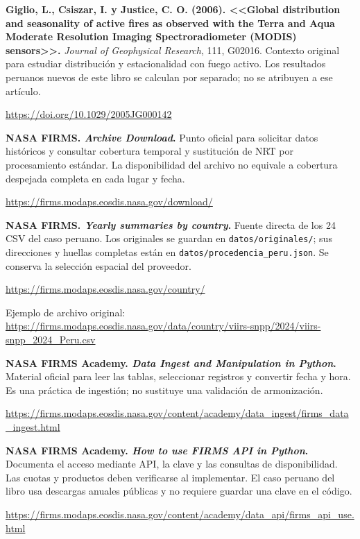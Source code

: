 \begin{enumerate}[label={[\arabic*]},ref=\arabic*,leftmargin=2.2em,itemsep=1em]
\item\label{src:giglio-season} \textbf{Giglio, L., Csiszar, I. y Justice, C. O. (2006).
<<Global distribution and seasonality of active fires as observed with the Terra and Aqua
Moderate Resolution Imaging Spectroradiometer (MODIS) sensors>>.}
\emph{Journal of Geophysical Research}, 111, G02016. Contexto original para estudiar
distribución y estacionalidad con fuego activo. Los resultados peruanos nuevos de este
libro se calculan por separado; no se atribuyen a ese artículo.
\par\url{https://doi.org/10.1029/2005JG000142}

\item\label{src:firms-archive} \textbf{NASA FIRMS. \emph{Archive Download}.}
Punto oficial para solicitar datos históricos y consultar cobertura temporal y sustitución
de NRT por procesamiento estándar. La disponibilidad del archivo no equivale a cobertura
despejada completa en cada lugar y fecha.
\par\url{https://firms.modaps.eosdis.nasa.gov/download/}

\item\label{src:firms-country} \textbf{NASA FIRMS. \emph{Yearly summaries by country}.}
Fuente directa de los 24 CSV del caso peruano. Los originales se guardan en
\texttt{datos/originales/}; sus direcciones y huellas completas están en
\texttt{datos/procedencia\_peru.json}. Se conserva la selección espacial del proveedor.
\par\url{https://firms.modaps.eosdis.nasa.gov/country/}
\par Ejemplo de archivo original:
\url{https://firms.modaps.eosdis.nasa.gov/data/country/viirs-snpp/2024/viirs-snpp_2024_Peru.csv}

\item\label{src:firms-ingest} \textbf{NASA FIRMS Academy. \emph{Data Ingest and Manipulation
in Python}.} Material oficial para leer las tablas, seleccionar registros y convertir
fecha y hora. Es una práctica de ingestión; no sustituye una validación de armonización.
\par\url{https://firms.modaps.eosdis.nasa.gov/content/academy/data_ingest/firms_data_ingest.html}

\item\label{src:firms-api} \textbf{NASA FIRMS Academy. \emph{How to use FIRMS API in Python}.}
Documenta el acceso mediante API, la clave y las consultas de disponibilidad. Las cuotas
y productos deben verificarse al implementar. El caso peruano del libro usa descargas
anuales públicas y no requiere guardar una clave en el código.
\par\url{https://firms.modaps.eosdis.nasa.gov/content/academy/data_api/firms_api_use.html}


\end{enumerate}
